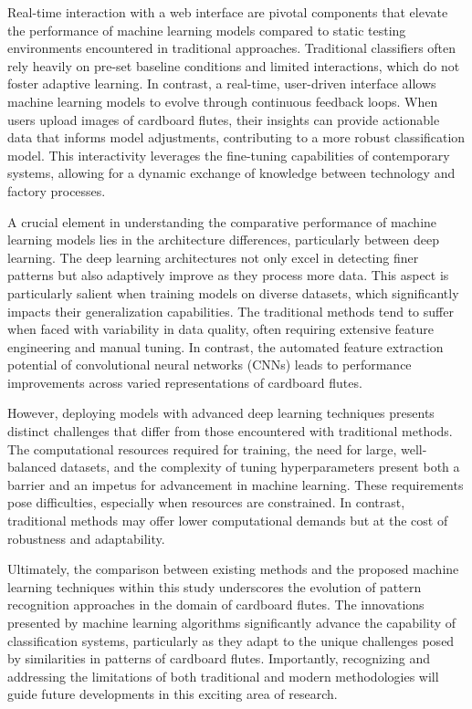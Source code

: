Real-time interaction with a web interface are pivotal components that elevate the performance of machine learning models compared to static testing environments encountered in traditional approaches. Traditional classifiers often rely heavily on pre-set baseline conditions and limited interactions, which do not foster adaptive learning. In contrast, a real-time, user-driven interface allows machine learning models to evolve through continuous feedback loops. When users upload images of cardboard flutes, their insights can provide actionable data that informs model adjustments, contributing to a more robust classification model. This interactivity leverages the fine-tuning capabilities of contemporary systems, allowing for a dynamic exchange of knowledge between technology and factory processes.

A crucial element in understanding the comparative performance of machine learning models lies in the architecture differences, particularly between deep learning. The deep learning architectures not only excel in detecting finer patterns but also adaptively improve as they process more data. This aspect is particularly salient when training models on diverse datasets, which significantly impacts their generalization capabilities. The traditional methods tend to suffer when faced with variability in data quality, often requiring extensive feature engineering and manual tuning. In contrast, the automated feature extraction potential of convolutional neural networks (CNNs) leads to performance improvements across varied representations of cardboard flutes.

However, deploying models with advanced deep learning techniques presents distinct challenges that differ from those encountered with traditional methods. The computational resources required for training, the need for large, well-balanced datasets, and the complexity of tuning hyperparameters present both a barrier and an impetus for advancement in machine learning. These requirements pose difficulties, especially when resources are constrained. In contrast, traditional methods may offer lower computational demands but at the cost of robustness and adaptability.

Ultimately, the comparison between existing methods and the proposed machine learning techniques within this study underscores the evolution of pattern recognition approaches in the domain of cardboard flutes. The innovations presented by machine learning algorithms significantly advance the capability of classification systems, particularly as they adapt to the unique challenges posed by similarities in patterns of cardboard flutes. Importantly, recognizing and addressing the limitations of both traditional and modern methodologies will guide future developments in this exciting area of research.

